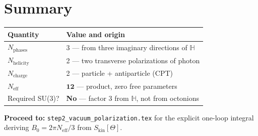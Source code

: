 \documentclass[12pt,a4paper]{article}
\theoremstyle{definition}
\theoremstyle{remark}
\renewcommand{\H}{\mathbb{H}}
\newcommand{\Neff}{N_{\mathrm{eff}}}
\begin{document}
\section{Summary}
\label{sec:summary}
\begin{center}
\begin{tabular}{lp{8.5cm}}
  \toprule
  \textbf{Quantity} & \textbf{Value and origin} \\
  \midrule
  $N_\mathrm{phases}$ & 3 — from three imaginary directions of $\H$ \\
  $N_\mathrm{helicity}$ & 2 — two transverse polarizations of photon \\
  $N_\mathrm{charge}$ & 2 — particle + antiparticle (CPT) \\
  $\Neff$ & $\mathbf{12}$ — product, zero free parameters \\
  \midrule
  Required SU(3)? & \textbf{No} — factor 3 from $\H$, not from octonions \\
  \bottomrule
\end{tabular}
\end{center}

\noindent\textbf{Proceed to:}
\texttt{step2\_vacuum\_polarization.tex} for the explicit one-loop integral
deriving $B_0 = 2\pi\Neff/3$ from $S_\mathrm{kin}[\Theta]$.
\end{document}
